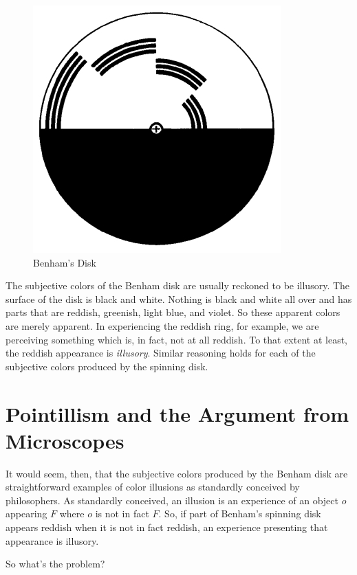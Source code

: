 \documentclass[12pt]{article}
\begin{document}
\begin{figure}[htbp]
	\centering
		\includegraphics[scale=.5]{graphics/benhams_disk.jpg}
	\caption{Benham's Disk}
	\label{fig:benham}
\end{figure}

The subjective colors of the Benham disk are usually reckoned to be illusory. The surface of the disk is black and white. Nothing is black and white all over and has parts that are reddish, greenish, light blue, and violet. So these apparent colors are merely apparent. In experiencing the reddish ring, for example, we are perceiving something which is, in fact, not at all reddish. To that extent at least, the reddish appearance is \emph{illusory}. Similar reasoning holds for each of the subjective colors produced by the spinning disk.

\section{Pointillism and the Argument from Microscopes}\label{sec:pointillism_and_the_argument_from_microscopes} %

It would seem, then, that the subjective colors produced by the Benham disk are straightforward examples of color illusions as standardly conceived by philosophers. As standardly conceived, an illusion is an experience of an object \( o \) appearing \( F \) where \( o \) is not in fact \( F \). So, if part of Benham's spinning disk appears reddish when it is not in fact reddish, an experience presenting that appearance is illusory. 

So what's the problem?
\end{document}
